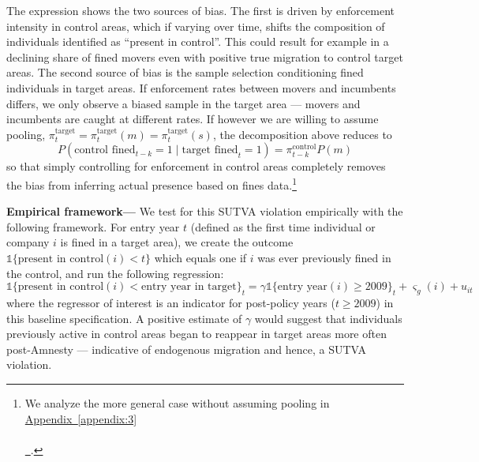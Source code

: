 \documentclass[12pt]{article}
\newcommand*{\appendixref}[2][]{%
  \hyperref[{appendix:#2}]{%
    Appendix~\ref*{appendix:#2}%
    \ifx\\#1\\%
    \else
      \,#1%
    \fi
  }%
}
\begin{document}
\quad The expression shows the two sources of bias. The first is driven by enforcement intensity in control areas, which if varying over time, shifts the composition of individuals identified as ``present in control''. This could result for example in a declining share of fined movers even with positive true migration to control target areas. The second source of bias is the sample selection conditioning fined individuals in target areas. If enforcement rates between movers and incumbents differs, we only observe a biased sample in the target area --- movers and incumbents are caught at different rates. If however we are willing to assume pooling,  $\pi_t^{\text{target}}=\pi_t^{\text{target}}(m)=\pi_t^{\text{target}}(s)$, the decomposition above reduces to
\begin{equation*}
P(\text{control fined}_{t-k} = 1 \mid \text{target fined}_t = 1)=\pi_{t-k}^{\text{control}}P(m)    
\end{equation*}
so that simply controlling for enforcement in control areas completely removes the bias from inferring actual presence based on fines data.\footnote{We analyze the more general case without assuming pooling in \appendixref{3}.} 
\

\quad \textbf{Empirical framework---} We test for this SUTVA violation empirically with the following framework. For entry year $t$ (defined as the first time individual or company $i$ is fined in a target area), we create the outcome $\mathbb{1}\{\text{present in control}(i) <t \}$ which equals one if $i$ was ever previously fined in the control, and run the following regression:%
\begin{equation}
\mathbb{1}\{\text{present in control}(i) < \text{entry year in target} \}_t = \gamma \mathbb{1}\{\text{entry year}(i) \geq 2009 \}_t+\varsigma_g(i)+u_{it} \label{eq:90}
\end{equation}
where the regressor of interest is an indicator for post-policy years ($t \geq 2009$) in this baseline specification. A positive estimate of $\gamma$ would suggest that individuals previously active in control areas began to reappear in target areas more often post-Amnesty --- indicative of endogenous migration and hence, a SUTVA violation.
\
\end{document}
